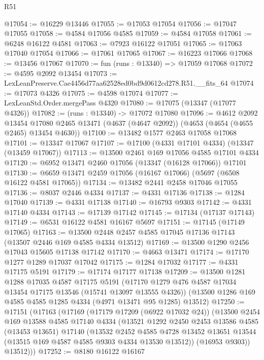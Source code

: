 \begin{lexlean}{R51}
\begin{coremodule}
@17054 := @16229 @13446
@17055 := @17053 @17054
@17056 := @17047 @17055
@17058 := @4584 @17056 @4585
@17059 := @4584 @17058
@17061 := @6248 @16122 @4581
@17063 := @7923 @16122 @17051
@17065 := @17063 @17040 @17054
@17066 := @17061 @17065
@17067 := @16223 @17066
@17068 := @13456 @17067
@17070 := fun (runs : @13340) => @17059 @17068
@17072 := @4595 @2092 @13454
@17073 := LexLeanPreserve.Cae4456d77aa62528ed0bd9d0612cd278.R51.__fits_64
@17074 := @17073 @4326
@17075 := @4598 @17074
@17077 := LexLeanStd.Order.mergePass @4320
@17080 := @17075 (@13347 (@17077 @4326))
@17082 := (runs : @13340) -> @17072 @17080
@17096 := @4612
    @2092
    @13454
    @17080
    @2465
    @13471
    (@4637 (@4647 @2092))
    (@4653 (@4654 (@4655 @2465) @13454 @4630))
@17100 := @13482 @1577 @2463 @17058 @17068
@17101 := @13347 @17067
@17107 := @17100 (@4331 @17101 @4334) (@13347 (@13459 @17067))
@17113 := @13500 @2461 @169 @17056 @4585 @17101 @4334
@17120 := @6952 @13471 @2460 @17056 (@13347 (@16128 @17066)) @17101
@17130 := @6659 @13471 @2459 @17056 (@16167 @17066) (@5697 (@6508 @16122 @4581 @17065))
@17134 := @13482 @2441 @2458 @17046 @17055
@17136 := @8037 @2446 @4334
@17137 := @4331 @17136
@17138 := @1284 @17040
@17139 := @4331 @17138
@17140 := @16793 @9303
@17142 := @4331 @17140 @4334
@17143 := @17139 @17142
@17145 := @17134 (@17137 @17143)
@17149 := @6531 @16122 @4581 @16167 @5697
@17151 := @17145 (@17149 @17065)
@17163 := @13500 @2448 @2457 @4585 @17045 @17136 @17143 (@13507 @2446 @169 @4585 @4334 @13512)
@17169 := @13500 @1290 @2456 @17043 @15605 @17138 @17142
@17170 := @4663 @13471
@17174 := @17170 @1277 @1289 @17037 @17042
@17175 := @1284 @17032
@17177 := @4331 @17175 @5191
@17179 := @17174 @17177 @17138
@17209 := @13500
    @1281
    @1288
    @17035
    @4587
    @17175
    @5191
    (@17170 @1279 @476 @4587 @17034 @13454 @17175 @13546 (@15741 @13097 @13555 @4326))
    (@13500 @1286 @169 @4585 @4585 @1285 @4334 (@4971 @13471 @95 @1285) @13512)
@17250 := @17151
    (@17163
      (@17169
        (@17179 @17209 (@6922 @17032 @24))
        (@13500
          @2454
          @169
          @13588
          @4585
          @17140
          @4334
          (@13521
            @1292
            @2450
            @2453
            @13586
            @4585
            (@13453 @13651)
            @17140
            (@13532
              @2452
              @4585
              @4728
              @13452
              @13651
              @13544
              (@13515 @169 @4587 @4585 @9303 @4334 @13530 @13512))
            (@16953 @9303))
          @13512)))
@17252 := @8180 @16122 @16167

\end{coremodule}
\end{lexlean}
